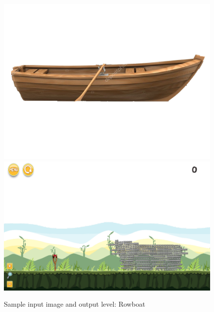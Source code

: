\documentclass{dalthesis}
\begin{document}
\begin{figure}
	\caption{Sample input image and output level: Rowboat}
  \includegraphics[width=\textwidth,height=\textheight,keepaspectratio]{levels/pictures/ships/rowboat.jpg}
  \includegraphics[width=\textwidth,height=\textheight,keepaspectratio]{levels/screenshots/ships/rowboat.png}
\end{figure}



\end{document}
